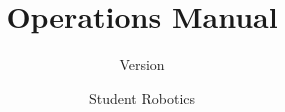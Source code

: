 \documentclass[a4paper]{scrreprt}
\title{Operations Manual}
\subtitle{Version }
\author{Student Robotics}
\begin{document}
\maketitle

\tableofcontents









\begin{appendices}

\end{appendices}
\end{document}
